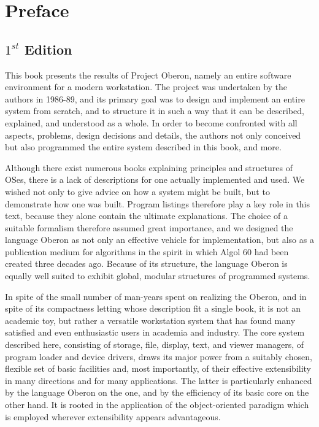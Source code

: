 \setcounter{chapter}{-1}
\chapter{Preface}
\section{$1^{st}$ Edition}
This book presents the results of Project Oberon, namely an entire software environment for a
modern workstation. The project was undertaken by the authors in 1986-89, and its
primary goal was to design and implement an entire system from scratch, and to structure it in
such a way that it can be described, explained, and understood as a whole. In order to become
confronted with all aspects, problems, design decisions and details, the authors not only
conceived but also programmed the entire system described in this book, and more.

Although there exist numerous books explaining principles and structures of OSes,
there is a lack of descriptions for one actually implemented and used. We wished not only to
give advice on how a system might be built, but to demonstrate how one was built. Program
listings therefore play a key role in this text, because they alone contain the ultimate explanations.
The choice of a suitable formalism therefore assumed great importance, and we designed the
language Oberon as not only an effective vehicle for implementation, but also as a publication
medium for algorithms in the spirit in which Algol 60 had been created three decades ago.
Because of its structure, the language Oberon is equally well suited to exhibit global, modular
structures of programmed systems.

In spite of the small number of man-years spent on realizing the Oberon, and in spite of its
compactness letting whose description fit a single book, it is not an academic toy, but rather a versatile
workstation system that has found many satisfied and even enthusiastic users in academia and
industry. The core system described here, consisting of storage, file, display, text, and viewer
managers, of program loader and device drivers, draws its major power from a suitably chosen,
flexible set of basic facilities and, most importantly, of their effective extensibility in many
directions and for many applications. The latter is particularly enhanced by the language
Oberon on the one, and by the efficiency of its basic core on the other hand. It is rooted in the
application of the object-oriented paradigm which is employed wherever extensibility appears advantageous.

